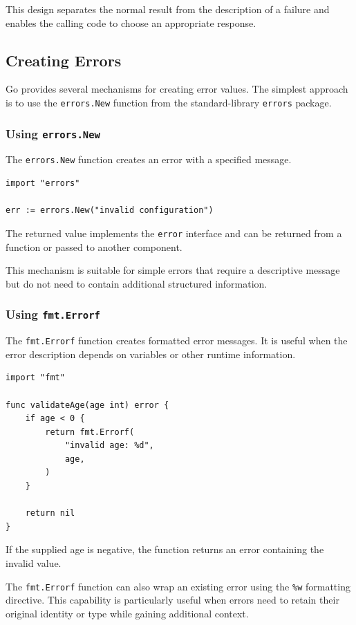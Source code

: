 This design separates the normal result from the description of a failure and enables the calling code to choose an appropriate response.

\subsection{Creating Errors}

Go provides several mechanisms for creating error values. The simplest approach is to use the \texttt{errors.New} function from the standard-library \texttt{errors} package.

\subsubsection{Using \texttt{errors.New}}

The \texttt{errors.New} function creates an error with a specified message.

\begin{lstlisting}
import "errors"

err := errors.New("invalid configuration")
\end{lstlisting}

The returned value implements the \texttt{error} interface and can be returned from a function or passed to another component.

This mechanism is suitable for simple errors that require a descriptive message but do not need to contain additional structured information.

\subsubsection{Using \texttt{fmt.Errorf}}

The \texttt{fmt.Errorf} function creates formatted error messages. It is useful when the error description depends on variables or other runtime information.

\begin{lstlisting}
import "fmt"

func validateAge(age int) error {
    if age < 0 {
        return fmt.Errorf(
            "invalid age: %d",
            age,
        )
    }

    return nil
}
\end{lstlisting}

If the supplied age is negative, the function returns an error containing the invalid value.

The \texttt{fmt.Errorf} function can also wrap an existing error using the \texttt{\%w} formatting directive. This capability is particularly useful when errors need to retain their original identity or type while gaining additional context.

